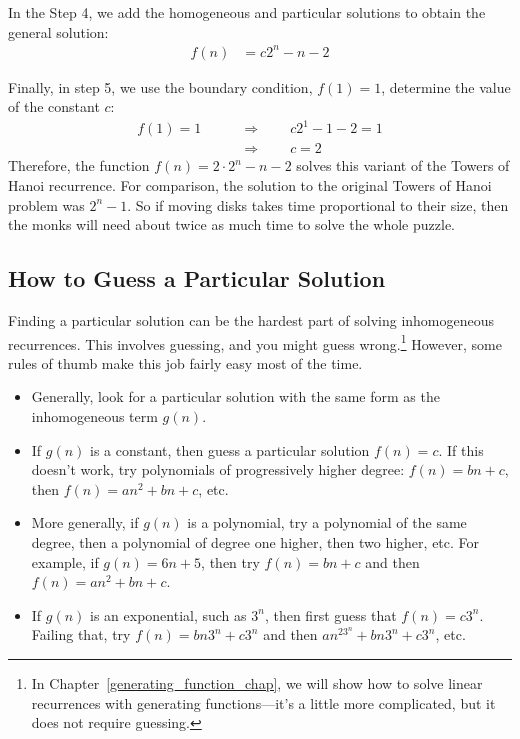 In the Step 4, we add the homogeneous and particular solutions to
obtain the general solution:
\begin{align*}
f(n) & = c 2^n - n - 2
\end{align*}

Finally, in step 5, we use the boundary condition, $f(1) = 1$,
determine the value of the constant $c$:
\begin{align*}
f(1) = 1 \qquad & \Rightarrow \qquad c 2^1 - 1 - 2 = 1 \\
  & \Rightarrow \qquad c = 2
\end{align*}
Therefore, the function $f(n) = 2 \cdot 2^n - n - 2$ solves this
variant of the Towers of Hanoi recurrence.  For comparison, the
solution to the original Towers of Hanoi problem was $2^n - 1$.  So if
moving disks takes time proportional to their size, then the monks
will need about twice as much time to solve the whole puzzle.

\subsection{How to Guess a Particular Solution}

Finding a particular solution can be the hardest part of solving
inhomogeneous recurrences. This involves guessing, and you might guess
wrong.\footnote{In Chapter~\ref{generating_function_chap}, we will
  show how to solve linear recurrences with generating
  functions---it's a little more complicated, but it does not require
  guessing.}  However, some rules of thumb make this job fairly easy
most of the time.

\begin{itemize}
\item Generally, look for a particular solution with the same form as
  the inhomogeneous term $g(n)$.
\item If $g(n)$ is a constant, then guess a particular solution $f(n)
  = c$. If this doesn't work, try polynomials of progressively higher
  degree:  $f(n)=bn+c$, then $f(n)=an^2 +bn+c$, etc.
\item More generally, if $g(n)$ is a polynomial, try a polynomial of
  the same degree, then a polynomial of degree one higher, then two
  higher, etc. For example, if $g(n) = 6n + 5$, then try $f(n)=bn+c$
  and then $f(n)=an^2 +bn+c$.
\item If $g(n)$ is an exponential, such as $3^n$, then first guess
  that $f(n) = c3^n$. Failing that, try $f(n) = bn3^n + c3^n$ and then
  $an^23^n + bn3^n + c3^n$, etc.
\end{itemize}

